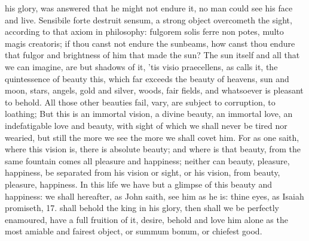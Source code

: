 {his glory, was answered that he might not endure it, no man could see
his face and live. Sensibile forte destruit sensum, a strong object
overcometh the sight, according to that axiom in philosophy: fulgorem
solis ferre non potes, multo magis creatoris; if thou canst not endure
the sunbeams, how canst thou endure that fulgor and brightness of him
that made the sun? The sun itself and all that we can imagine, are but
shadows of it, 'tis visio praecellens, as \Austin{} calls it, the
quintessence of beauty this, which far exceeds the beauty of heavens,
sun and moon, stars, angels, gold and silver, woods, fair fields, and
whatsoever is pleasant to behold. All those other beauties fail, vary,
are subject to corruption, to loathing; But this is an immortal
vision, a divine beauty, an immortal love, an indefatigable love and
beauty, with sight of which we shall never be tired nor wearied, but
still the more we see the more we shall covet him. For as one
saith, where this vision is, there is absolute beauty; and where is
that beauty, from the same fountain comes all pleasure and happiness;
neither can beauty, pleasure, happiness, be separated from his vision
or sight, or his vision, from beauty, pleasure, happiness. In this life
we have but a glimpse of this beauty and happiness: we shall hereafter,
as John saith, see him as he is: thine eyes, as Isaiah promiseth,
 17. shall behold the king in his glory, then shall we be
perfectly enamoured, have a full fruition of it, desire, behold
and love him alone as the most amiable and fairest object, or summum
bonum, or chiefest good.

}
